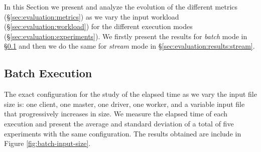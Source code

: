 In this Section we present and analyze the evolution of the different metrics (\S\ref{sec:evaluation:metrics}) as we vary the input workload (\S\ref{sec:evaluation:workload}) for the different execution modes (\S\ref{sec:evaluation:experiments}).
We firstly present the results for \emph{batch} mode in \S\ref{sec:evaluation:results:batch} and then we do the same for \emph{stream} mode in \S\ref{sec:evaluation:results:stream}.

\subsection{Batch Execution} \label{sec:evaluation:results:batch}

The exact configuration for the study of the elapsed time as we vary the input file size is: one client, one master, one driver, one worker, and a variable input file that progressively increases in size. 
We measure the elapsed time of each execution and present the average and standard deviation of a total of five experiments with the same configuration.
The results obtained are include in Figure \ref{fig:batch-input-size}.

